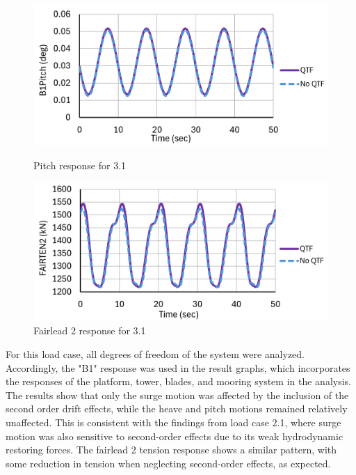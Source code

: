 \documentclass[a4paper, 11pt]{article}
\begin{document}
\begin{figure}[H]
    \begin{minipage}{0.48\textwidth}
        \centering
        \includegraphics[width=1\textwidth]{3.1_pitch.png}
        \caption{\small Pitch response for 3.1}
        \label{fig:3.1_pitch}
    \end{minipage}
    \hfill
    \begin{minipage}{0.48\textwidth}
        \centering
        \includegraphics[width=1\textwidth]{3.1_fairten.png}
        \caption{\small Fairlead 2 response for 3.1}
        \label{fig:3.1_fairten}
    \end{minipage}
\end{figure}

For this load case, all degrees of freedom of the system were analyzed. Accordingly, the "B1" response was used in the result graphs, which incorporates the responses of the platform, tower, blades, and mooring system in the analysis. The results show that only the surge motion was affected by the inclusion of the second order drift effects, while the heave and pitch motions remained relatively unaffected. This is consistent with the findings from load case 2.1, where surge motion was also sensitive to second-order effects due to its weak hydrodynamic restoring forces. The fairlead 2 tension response shows a similar pattern, with some reduction in tension when neglecting second-order effects, as expected.
\end{document}
